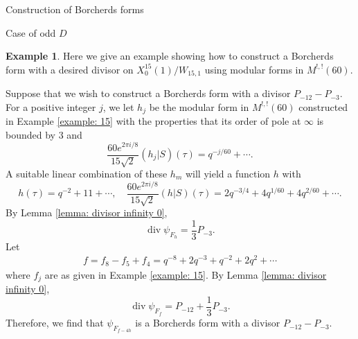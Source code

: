 \documentclass{amsart}
\newcounter{lemma}
\theoremstyle{definition}
\newtheorem{Example}[lemma]{Example}
\def\div{\operatorname{div}}
\begin{document}
\begin{section}{Construction of Borcherds forms}
\begin{subsection}{Case of odd $D$}
\begin{Example} \label{example: 15 2}
  Here we give an example showing how to construct a
  Borcherds form with a desired divisor on $X_0^{15}(1)/W_{15,1}$
  using modular forms in $M^{!,!}(60)$.

  Suppose that we wish to construct a Borcherds form with a divisor
  $P_{-12}-P_{-3}$. For a positive integer $j$, we let $h_j$ be the
  modular form in $M^{!,!}(60)$ constructed in Example \ref{example:
    15} with the properties that its order of pole at
  $\infty$ is bounded by $3$ and
  $$
    \frac{60e^{2\pi i/8}}{15\sqrt2}(h_j\big|S)(\tau)=q^{-j/60}+\cdots.
  $$
  A suitable linear combination of these $h_m$ will yield a function
  $h$ with
  \begin{equation} \label{equation: 15 h}
    h(\tau)=q^{-2}+11+\cdots, \quad
    \frac{60e^{2\pi i/8}}{15\sqrt2}(h\big|S)(\tau)
   =2q^{-3/4}+4q^{1/60}+4q^{2/60}+\cdots.
  \end{equation}
  By Lemma \ref{lemma: divisor infinity 0},
  $$
    \div\psi_{F_h}=\frac13P_{-3}.
  $$
  Let
  \begin{equation*}
  \begin{split}
    f=f_8-f_5+f_4=q^{-8}+2q^{-3}+q^{-2}+2q^2+\cdots
  \end{split}
  \end{equation*}
  where $f_j$ are as given in Example \ref{example: 15}. By Lemma
  \ref{lemma: divisor infinity 0},
  $$
    \div\psi_{F_f}=P_{-12}+\frac13P_{-3}.
  $$
  Therefore, we find that $\psi_{F_{f-4h}}$  is a Borcherds form with
  a divisor $P_{-12}-P_{-3}$.
\end{Example}



\end{subsection}
\end{section}
\end{document}
